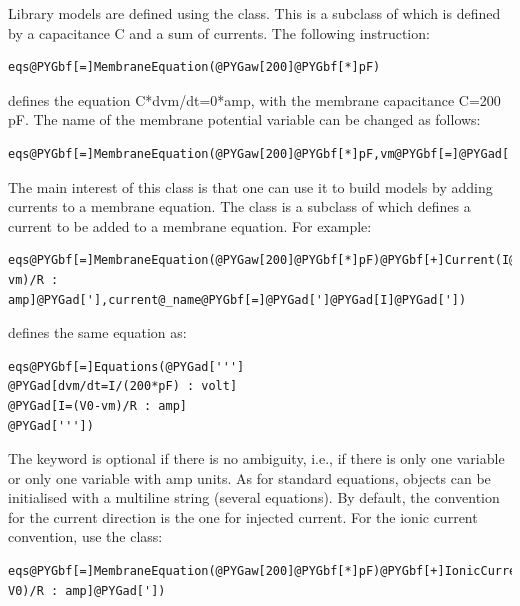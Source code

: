 \documentclass[letterpaper,10pt,english]{manual}
\begin{document}
Library models are defined using the  class. This is a subclass of
\hyperlink{brian.Equations}{} which is defined by a capacitance C and a sum of currents. The following instruction:

\begin{Verbatim}[commandchars=@\[\]]
eqs@PYGbf[=]MembraneEquation(@PYGaw[200]@PYGbf[*]pF)
\end{Verbatim}

defines the equation C*dvm/dt=0*amp, with the membrane capacitance C=200 pF. The name of the membrane potential
variable can be changed as follows:

\begin{Verbatim}[commandchars=@\[\]]
eqs@PYGbf[=]MembraneEquation(@PYGaw[200]@PYGbf[*]pF,vm@PYGbf[=]@PYGad[']@PYGad[V]@PYGad['])
\end{Verbatim}

The main interest of this class is that one can use it to build models by adding currents to a membrane
equation. The  class is a subclass of \hyperlink{brian.Equations}{} which defines a current to be added
to a membrane equation. For example:

\begin{Verbatim}[commandchars=@\[\]]
eqs@PYGbf[=]MembraneEquation(@PYGaw[200]@PYGbf[*]pF)@PYGbf[+]Current(I@PYGbf[=]@PYGad[']@PYGad[(V0-vm)/R : amp]@PYGad['],current@_name@PYGbf[=]@PYGad[']@PYGad[I]@PYGad['])
\end{Verbatim}

defines the same equation as:

\begin{Verbatim}[commandchars=@\[\]]
eqs@PYGbf[=]Equations(@PYGad[''']
@PYGad[dvm/dt=I/(200*pF) : volt]
@PYGad[I=(V0-vm)/R : amp]
@PYGad['''])
\end{Verbatim}

The keyword  is optional if there is no ambiguity, i.e., if there is only one variable
or only one variable with amp units. As for standard equations,  objects can be initialised with
a multiline string (several equations). By default, the convention for the current direction is the one for injected
current. For the ionic current convention, use the  class:

\begin{Verbatim}[commandchars=@\[\]]
eqs@PYGbf[=]MembraneEquation(@PYGaw[200]@PYGbf[*]pF)@PYGbf[+]IonicCurrent(I@PYGbf[=]@PYGad[']@PYGad[(vm-V0)/R : amp]@PYGad['])
\end{Verbatim}
\end{document}
